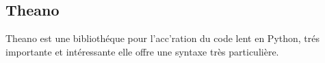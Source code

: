 \subsection{Theano}
Theano est une biblioth\'eque pour l'acc\e'ration du code lent en Python, tr\'es importante et intéressante
elle offre une syntaxe très particulière.